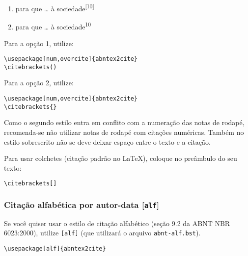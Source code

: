 \documentclass[a4paper]{ltxdoc}
\begin{document}
\begin{enumerate}
\item para que \ldots{} à sociedade\textsuperscript{[10]}
\item para que \ldots{} à sociedade\textsuperscript{10}
\end{enumerate}

\DescribeMacro{\citebrackets[]}\DescribeMacro{\citebrackets()}
\DescribeMacro{\citebrackets\{\}}

Para a opção 1, utilize:

\begin{verbatim}
\usepackage[num,overcite]{abntex2cite}
\citebrackets()
\end{verbatim} 


Para a opção 2, utilize:

\begin{verbatim}
\usepackage[num,overcite]{abntex2cite}
\citebrackets{}
\end{verbatim} 



Como o segundo estilo entra em conflito com a numeração das notas de
rodapé, recomenda-se não utilizar notas de rodapé com citações numéricas. Também no estilo sobrescrito não se deve deixar espaço entre o texto e a citação. %

Para usar colchetes (citação padrão no \LaTeX), coloque no preâmbulo do seu texto:

\begin{verbatim}
\citebrackets[]
\end{verbatim}


\subsubsection{Citação alfabética por autor-data [\texttt{alf}]}

\DescribeMacro{\usepackage[alf]{abntex2cite}}
Se você quiser usar o estilo de citação alfabético
(seção 9.2 da ABNT NBR 6023:2000\cite{NBR6023:2000}),
utilize \texttt{[alf]} (que utilizará o arquivo \texttt{abnt-alf.bst}).

\begin{verbatim}
\usepackage[alf]{abntex2cite}
\end{verbatim}
\end{document}
